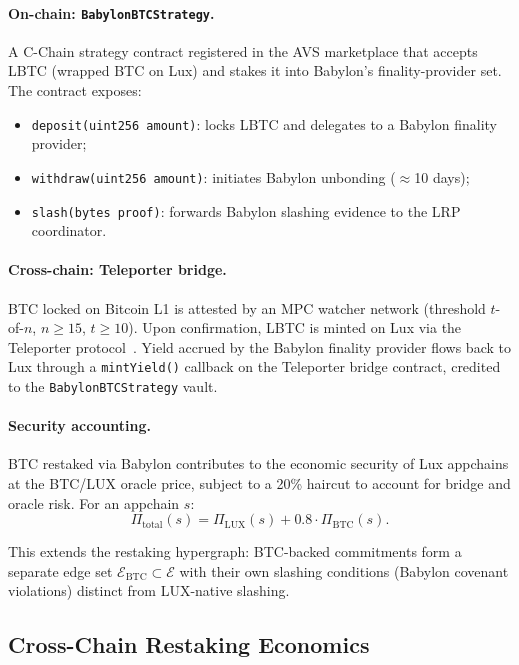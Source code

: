 \documentclass[11pt]{article}
\begin{document}
\paragraph{On-chain: \texttt{BabylonBTCStrategy}.}
A C-Chain strategy contract registered in the AVS marketplace that accepts LBTC (wrapped
BTC on Lux) and stakes it into Babylon's finality-provider set.  The contract exposes:
\begin{itemize}[leftmargin=1.5em]
  \item \texttt{deposit(uint256 amount)}: locks LBTC and delegates to a Babylon finality
    provider;
  \item \texttt{withdraw(uint256 amount)}: initiates Babylon unbonding ($\approx$10 days);
  \item \texttt{slash(bytes proof)}: forwards Babylon slashing evidence to the LRP
    coordinator.
\end{itemize}

\paragraph{Cross-chain: Teleporter bridge.}
BTC locked on Bitcoin L1 is attested by an MPC watcher network (threshold $t$-of-$n$,
$n \geq 15$, $t \geq 10$).  Upon confirmation, LBTC is minted on Lux via the Teleporter
protocol~\cite{lux2025teleporter}.  Yield accrued by the Babylon finality provider flows
back to Lux through a \texttt{mintYield()} callback on the Teleporter bridge contract,
credited to the \texttt{BabylonBTCStrategy} vault.

\paragraph{Security accounting.}
BTC restaked via Babylon contributes to the economic security of Lux appchains at the
BTC/LUX oracle price, subject to a 20\% haircut to account for bridge and oracle risk.
For an appchain $s$:
\[
  \Pi_{\text{total}}(s) = \Pi_{\text{LUX}}(s) + 0.8 \cdot \Pi_{\text{BTC}}(s).
\]

This extends the restaking hypergraph: BTC-backed commitments form a separate edge set
$\mathcal{E}_{\text{BTC}} \subset \mathcal{E}$ with their own slashing conditions
(Babylon covenant violations) distinct from LUX-native slashing.

\subsection{Cross-Chain Restaking Economics}
\label{sec:crosschain}
\end{document}
